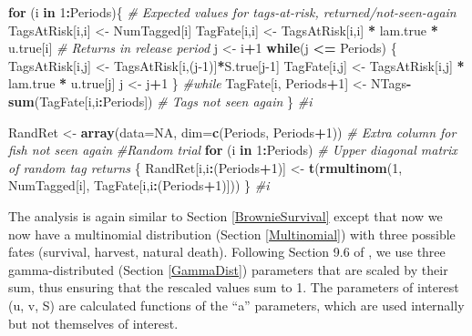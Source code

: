 \documentclass[
]{krantz}
\makeatletter
\newenvironment{Shaded}{\begin{snugshade}}{\end{snugshade}}
\newcommand{\AttributeTok}[1]{\textcolor[rgb]{0.27,0.27,0.27}{#1}}
\newcommand{\CommentTok}[1]{\textcolor[rgb]{0.37,0.37,0.37}{\textit{#1}}}
\newcommand{\ConstantTok}[1]{\textcolor[rgb]{0.37,0.37,0.37}{#1}}
\newcommand{\ControlFlowTok}[1]{\textcolor[rgb]{0.27,0.27,0.27}{\textbf{#1}}}
\newcommand{\DecValTok}[1]{\textcolor[rgb]{0.06,0.06,0.06}{#1}}
\newcommand{\FunctionTok}[1]{\textcolor[rgb]{0.27,0.27,0.27}{\textbf{#1}}}
\newcommand{\NormalTok}[1]{#1}
\newcommand{\OtherTok}[1]{\textcolor[rgb]{0.37,0.37,0.37}{#1}}
\newcommand{\SpecialCharTok}[1]{\textcolor[rgb]{0.43,0.43,0.43}{\textbf{#1}}}
\newenvironment{kframe}{%
\medskip{}
\setlength{\fboxsep}{.8em}
 \def\at@end@of@kframe{}%
 \ifinner\ifhmode%
  \def\at@end@of@kframe{\end{minipage}}%
  \begin{minipage}{\columnwidth}%
 \fi\fi%
 \def\FrameCommand##1{\hskip\@totalleftmargin \hskip-\fboxsep
 \colorbox{shadecolor}{##1}\hskip-\fboxsep
     \hskip-\linewidth \hskip-\@totalleftmargin \hskip\columnwidth}%
 \MakeFramed {\advance\hsize-\width
   \@totalleftmargin\z@ \linewidth\hsize
   \@setminipage}}%
 {\par\unskip\endMakeFramed%
 \at@end@of@kframe}
\renewenvironment{Shaded}{\begin{kframe}}{\end{kframe}}
\makeatother
\begin{document}
\begin{Shaded}
\begin{Highlighting}[]
\ControlFlowTok{for}\NormalTok{ (i }\ControlFlowTok{in} \DecValTok{1}\SpecialCharTok{:}\NormalTok{Periods)\{ }
\CommentTok{\# Expected values for tags{-}at{-}risk, returned/not{-}seen{-}again}
\NormalTok{  TagsAtRisk[i,i] }\OtherTok{\textless{}{-}}\NormalTok{ NumTagged[i]}
\NormalTok{  TagFate[i,i] }\OtherTok{\textless{}{-}}\NormalTok{  TagsAtRisk[i,i] }\SpecialCharTok{*}\NormalTok{ lam.true }\SpecialCharTok{*}\NormalTok{ u.true[i] }
   \CommentTok{\# Returns in release period}
\NormalTok{  j }\OtherTok{\textless{}{-}}\NormalTok{ i}\SpecialCharTok{+}\DecValTok{1}
  \ControlFlowTok{while}\NormalTok{(j }\SpecialCharTok{\textless{}=}\NormalTok{ Periods) \{}
\NormalTok{    TagsAtRisk[i,j] }\OtherTok{\textless{}{-}}\NormalTok{ TagsAtRisk[i,(j}\DecValTok{{-}1}\NormalTok{)]}\SpecialCharTok{*}\NormalTok{S.true[j}\DecValTok{{-}1}\NormalTok{]}
\NormalTok{    TagFate[i,j] }\OtherTok{\textless{}{-}}\NormalTok{ TagsAtRisk[i,j] }\SpecialCharTok{*}\NormalTok{ lam.true }\SpecialCharTok{*}\NormalTok{ u.true[j]}
\NormalTok{    j }\OtherTok{\textless{}{-}}\NormalTok{ j}\SpecialCharTok{+}\DecValTok{1}
\NormalTok{   \} }\CommentTok{\#while}
\NormalTok{  TagFate[i, Periods}\SpecialCharTok{+}\DecValTok{1}\NormalTok{] }\OtherTok{\textless{}{-}}\NormalTok{ NTags}\SpecialCharTok{{-}}\FunctionTok{sum}\NormalTok{(TagFate[i,i}\SpecialCharTok{:}\NormalTok{Periods]) }
    \CommentTok{\# Tags not seen again}
\NormalTok{  \} }\CommentTok{\#i}

\NormalTok{RandRet }\OtherTok{\textless{}{-}} \FunctionTok{array}\NormalTok{(}\AttributeTok{data=}\ConstantTok{NA}\NormalTok{, }\AttributeTok{dim=}\FunctionTok{c}\NormalTok{(Periods, Periods}\SpecialCharTok{+}\DecValTok{1}\NormalTok{))  }
  \CommentTok{\# Extra column for fish not seen again}
\CommentTok{\#Random trial}
  \ControlFlowTok{for}\NormalTok{ (i }\ControlFlowTok{in} \DecValTok{1}\SpecialCharTok{:}\NormalTok{Periods) }\CommentTok{\# Upper diagonal matrix of random tag returns}
\NormalTok{  \{}
\NormalTok{    RandRet[i,i}\SpecialCharTok{:}\NormalTok{(Periods}\SpecialCharTok{+}\DecValTok{1}\NormalTok{)] }\OtherTok{\textless{}{-}} \FunctionTok{t}\NormalTok{(}\FunctionTok{rmultinom}\NormalTok{(}\DecValTok{1}\NormalTok{, NumTagged[i], }
\NormalTok{                                        TagFate[i,i}\SpecialCharTok{:}\NormalTok{(Periods}\SpecialCharTok{+}\DecValTok{1}\NormalTok{)]))}
\NormalTok{  \} }\CommentTok{\#i}
\end{Highlighting}
\end{Shaded}

The analysis is again similar to Section \ref{BrownieSurvival} except that now we now have a multinomial distribution (Section \ref{Multinomial}) with three possible fates (survival, harvest, natural death). Following Section 9.6 of \citet{kéry.schaub_2012}, we use three gamma-distributed (Section \ref{GammaDist}) parameters that are scaled by their sum, thus ensuring that the rescaled values sum to 1. The parameters of interest (u, v, S) are calculated functions of the ``a'' parameters, which are used internally but not themselves of interest.
\end{document}
